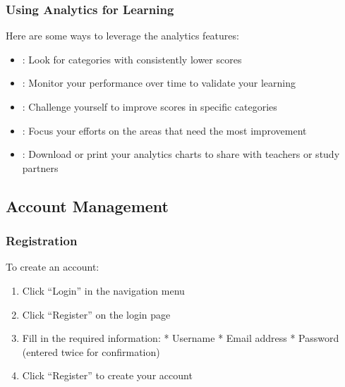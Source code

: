 \documentclass[letterpaper,10pt,english]{sphinxmanual}
\begin{document}
\subsubsection{Using Analytics for Learning}
\label{\detokenize{user_guide:using-analytics-for-learning}}
\sphinxAtStartPar
Here are some ways to leverage the analytics features:
\begin{itemize}
\item {} 
\sphinxAtStartPar
{}: Look for categories with consistently lower scores

\item {} 
\sphinxAtStartPar
{}: Monitor your performance over time to validate your learning

\item {} 
\sphinxAtStartPar
{}: Challenge yourself to improve scores in specific categories

\item {} 
\sphinxAtStartPar
{}: Focus your efforts on the areas that need the most improvement

\item {} 
\sphinxAtStartPar
{}: Download or print your analytics charts to share with teachers or study partners

\end{itemize}


\subsection{Account Management}
\label{\detokenize{user_guide:account-management}}

\subsubsection{Registration}
\label{\detokenize{user_guide:registration}}
\sphinxAtStartPar
To create an account:
\begin{enumerate}
%
\item {} 
\sphinxAtStartPar
Click “Login” in the navigation menu

\item {} 
\sphinxAtStartPar
Click “Register” on the login page

\item {} 
\sphinxAtStartPar
Fill in the required information:
* Username
* Email address
* Password (entered twice for confirmation)

\item {} 
\sphinxAtStartPar
Click “Register” to create your account

\end{enumerate}
\end{document}
